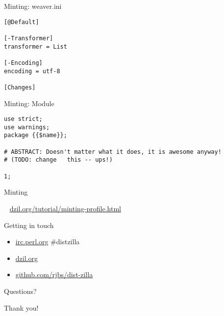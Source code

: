 \documentclass[serif,14pt,color=usenames,dvipsnames]{beamer}
\begin{document}
\begin{frame}[fragile]{Minting: weaver.ini}
\begin{verbatim}
[@Default]

[-Transformer]
transformer = List

[-Encoding]
encoding = utf-8

[Changes]
\end{verbatim}
\end{frame}

\begin{frame}[fragile]{Minting: Module}
\begin{verbatim}
use strict;
use warnings;
package {{$name}};

# ABSTRACT: Doesn't matter what it does, it is awesome anyway!
# (TODO: change   this -- ups!)

1;
\end{verbatim}
\end{frame}

\begin{frame}{Minting}
\begin{block}{~}
\center
\textcolor{purple}{
\url{dzil.org/tutorial/minting-profile.html}
}
\end{block}
\end{frame}

% 
% 
% 
% 
% 
% 

\begin{frame}{Getting in touch}
\begin{itemize}
	\item \url{irc.perl.org} \#distzilla
	\item \url{dzil.org}
	\item \url{github.com/rjbs/dist-zilla}
\end{itemize}
\end{frame}

\begin{frame}{Questions?}
	\begin{center}
	\end{center}
\end{frame}

\begin{frame}{Thank you!}
	\begin{center}
	\end{center}
\end{frame}
\end{document}
